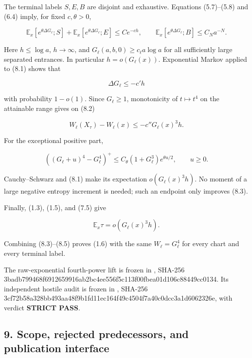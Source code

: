 The terminal labels \(S,E,B\) are disjoint and exhaustive. Equations
(5.7)--(5.8) and (6.4) imply, for fixed \(c,\theta>0\),

\[
 \mathbb E_x[e^{\theta\Delta G_\ell};S]
 +\mathbb E_x[e^{\theta\Delta G_\ell};E]
       \le Ce^{-ch},\qquad
 \mathbb E_x[e^{\theta\Delta G_\ell};B]\le C_Na^{-N}.      \tag{8.1}
\]

Here \(h\le\log a\), \(h\to\infty\), and
\(G_\ell(a,b,0)\ge c_\ell a\log a\) for all sufficiently large separated
entrances. In particular \(h=o(G_\ell(x))\). Exponential Markov applied
to (8.1) shows that

\[
                     \Delta G_\ell\le-c'h                 \tag{8.2}
\]

with probability \(1-o(1)\). Since \(G_\ell\ge1\), monotonicity of
\(t\mapsto t^4\) on the attainable range gives on (8.2)

\[
       W_\ell(X_\tau)-W_\ell(x)
                  \le-c''G_\ell(x)^3h.                    \tag{8.3}
\]

For the exceptional positive part,

\[
 ((G_\ell+u)^4-G_\ell^4)^+
        \le C_\theta(1+G_\ell^3)e^{\theta u/2},
 \qquad u\ge0.                                             \tag{8.4}
\]

Cauchy--Schwarz and (8.1) make its expectation \(o(G_\ell(x)^3h)\). No
moment of a large negative entropy increment is needed; such an endpoint
only improves (8.3).

Finally, (1.3), (1.5), and (7.5) give

\[
                  \mathbb E_x\tau
                       =o(G_\ell(x)^3h).                    \tag{8.5}
\]

Combining (8.3)--(8.5) proves (1.6) with the same \(W_\ell=G_\ell^4\)
for every chart and every terminal label.

The raw-exponential fourth-power lift is frozen in
\texttt{}, SHA-256
3badb799468f6912659916ab2bc4ee556f5c113f00fbea01d106c88449cc0134. Its
independent hostile audit is frozen in
\texttt{}, SHA-256
3cf72b58a328bb493aa48f9b1fd11ec164f49c4504f7a40c0dcc3a1d6062326e, with
verdict \textbf{STRICT PASS}.

\subsection{9. Scope, rejected predecessors, and publication
interface}

